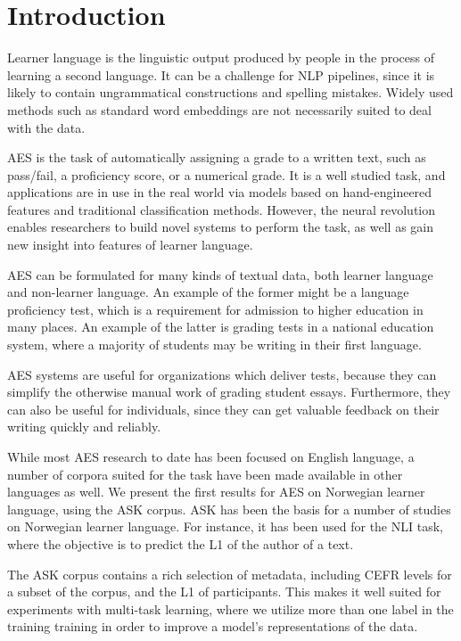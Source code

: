 \chapter{Introduction}

\acresetall

Learner language is the linguistic output produced by people in the process
of learning a second language. It can be a challenge for \ac{NLP} pipelines,
since it is likely to contain ungrammatical constructions and spelling
mistakes. Widely used methods such as standard word embeddings are not
necessarily suited to deal with the data. 

\ac{AES} is the task of automatically assigning a grade to a written text,
such as pass/fail, a proficiency score, or a numerical grade. It is a well
studied task, and applications are in use in the real world via models based
on hand-engineered features and traditional classification methods. However,
the neural revolution enables researchers to build novel systems to perform
the task, as well as gain new insight into features of learner language.

\ac{AES} can be formulated for many kinds of textual data, both learner
language and non-learner language. An example of the former might be a
language proficiency test, which is a requirement for admission to higher
education in many places. An example of the latter is grading tests in a
national education system, where a majority of students may be writing in
their first language.

\ac{AES} systems are useful for organizations which deliver tests, because
they can simplify the otherwise manual work of grading student essays.
Furthermore, they can also be useful for individuals, since they can get
valuable feedback on their writing quickly and reliably.

While most \ac{AES} research to date has been focused on English language, a
number of corpora suited for the task have been made available in other
languages as well. We present the first results for \ac{AES} on Norwegian
learner language, using the ASK corpus. ASK has been the basis for a number
of studies on Norwegian learner language. For instance, it has been used for
the \ac{NLI} task, where the objective is to predict the \ac{L1} of the
author of a text.

The ASK corpus contains a rich selection of metadata, including CEFR levels
for a subset of the corpus, and the \ac{L1} of participants. This makes it
well suited for experiments with multi-task learning, where we utilize more
than one label in the training training in order to improve a model's
representations of the data.

